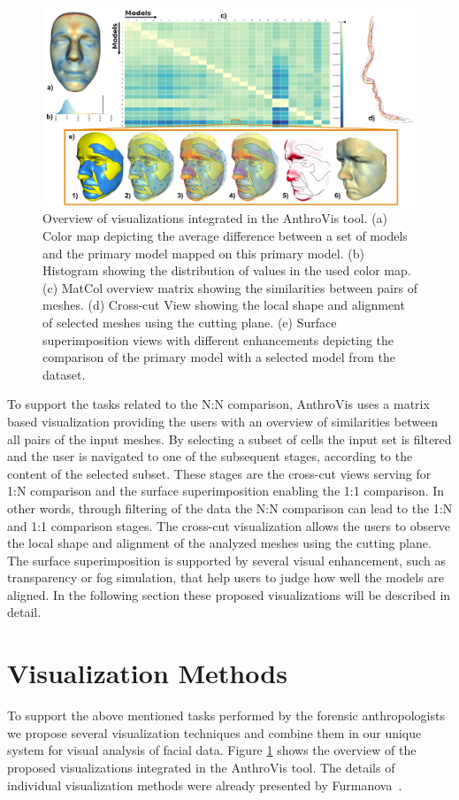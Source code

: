 \documentclass[final,5p,times]{elsarticle}
\begin{document}
\begin{figure}[htb]
	\centering
  \includegraphics[width=1.0\linewidth]{pictures/overview.png}
  \caption{\label{fig:overview}Overview of visualizations integrated in the AnthroVis tool. (a) Color map depicting the average difference between a set of models and the primary model mapped on this primary model. (b) Histogram showing the distribution of values in the used color map. (c) MatCol overview matrix showing the similarities between pairs of meshes. (d) Cross-cut View showing the local shape and alignment of selected meshes using the cutting plane. (e) Surface superimposition views with different enhancements depicting the comparison of the primary model with a selected model from the dataset.}
\end{figure}

To support the tasks related to the N:N comparison, AnthroVis uses a matrix based visualization providing the users with an overview of similarities between all pairs of the input meshes.
By selecting a subset of cells the input set is filtered and the user is navigated to one of the subsequent stages, according to the content of the selected subset.
These stages are the cross-cut views serving for 1:N comparison and the surface superimposition enabling the 1:1 comparison.
In other words, through filtering of the data the N:N comparison can lead to the 1:N and 1:1 comparison stages.
The cross-cut visualization allows the users to observe the local shape and alignment of the analyzed meshes using the cutting plane.
The surface superimposition is supported by several visual enhancement, such as transparency or fog simulation, that help users to judge how well the models are aligned.
In the following section these proposed visualizations will be described in detail.

\section{Visualization Methods} \label{exface}
To support the above mentioned tasks performed by the forensic anthropologists we propose several visualization techniques and combine them in our unique system for visual analysis of facial data.
Figure \ref{fig:overview} shows the overview of the proposed visualizations integrated in the AnthroVis tool.
The details of individual visualization methods were already presented by Furmanova~\cite{Furmanova2015}.
\end{document}
